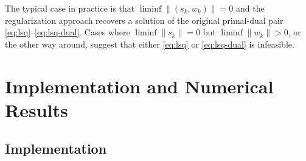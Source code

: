 \documentclass{amsart}
\begin{document}
The typical case in practice is that $\liminf \|(s_k,w_k)\| = 0$ and the
regularization approach recovers a solution of the original primal-dual pair
\eqref{eq:lsq}--\eqref{eq:lsq-dual}. Cases where $\liminf \|s_k\| = 0$ but
$\liminf \|w_k\| > 0$, or the other way around, suggest that either \eqref{eq:lsq}
or \eqref{eq:lsq-dual} is infeasible.

\section{Implementation and Numerical Results}
\label{sec:implementation}


\subsection{Implementation}
\end{document}
